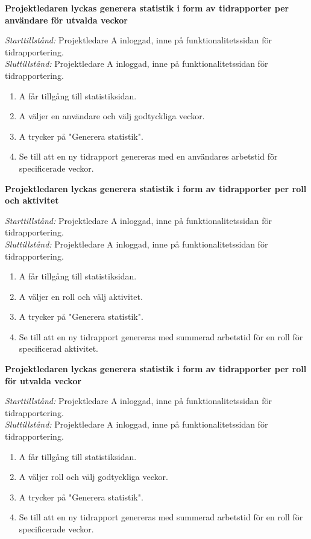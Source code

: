 \documentclass[a4paper]{article}
\begin{document}
\begin{FT}
\item
\textbf{Projektledaren lyckas generera statistik i form av tidrapporter per användare för utvalda veckor}

\emph{Starttillstånd:} Projektledare A inloggad, inne på funktionalitetssidan för tidrapportering.\\
\emph{Sluttillstånd:} Projektledare A inloggad, inne på funktionalitetssidan för tidrapportering.

\begin{enumerate}
\item A får tillgång till statistiksidan.
\item A väljer en användare och välj godtyckliga veckor.
\item A trycker på "Generera statistik".
\item Se till att en ny tidrapport genereras med en användares arbetstid för specificerade veckor.
\end{enumerate}


\item
\textbf{Projektledaren lyckas generera statistik i form av tidrapporter per roll och aktivitet}

\emph{Starttillstånd:} Projektledare A inloggad, inne på funktionalitetssidan för tidrapportering.\\
\emph{Sluttillstånd:} Projektledare A inloggad, inne på funktionalitetssidan för tidrapportering.

\begin{enumerate}
\item A får tillgång till statistiksidan.
\item A väljer en roll och välj aktivitet.
\item A trycker på "Generera statistik".
\item Se till att en ny tidrapport genereras med summerad arbetstid för en roll för specificerad aktivitet.
\end{enumerate}


\item
\textbf{Projektledaren lyckas generera statistik i form av tidrapporter per roll för utvalda veckor}

\emph{Starttillstånd:} Projektledare A inloggad, inne på funktionalitetssidan för tidrapportering.\\
\emph{Sluttillstånd:} Projektledare A inloggad, inne på funktionalitetssidan för tidrapportering.

\begin{enumerate}
\item A får tillgång till statistiksidan.
\item A väljer roll och välj godtyckliga veckor.
\item A trycker på "Generera statistik".
\item Se till att en ny tidrapport genereras med summerad arbetstid för en roll för specificerade veckor.
\end{enumerate}



\end{FT}
\end{document}
